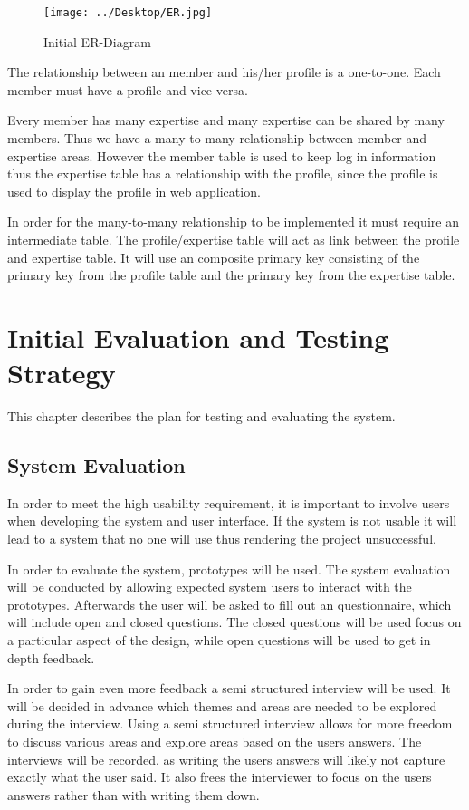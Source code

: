 \documentclass[a4paper,oneside,11pt]{report}
\begin{document}
\begin{figure}[!ht]
\centering
\texttt{[image: ../Desktop/ER.jpg]}
\caption{Initial ER-Diagram}
\end{figure}
The relationship between an member and his/her profile is a one-to-one. Each member must have a profile and vice-versa.

Every member has many expertise and many expertise can be shared by many members. Thus we have a many-to-many relationship between member and expertise areas. However the member table is used to keep log in information thus the expertise table has a relationship with the profile, since the profile is used to display the profile in web application.

In order for the many-to-many relationship to be implemented it must require an intermediate table. The profile/expertise table will act as link between the profile and expertise table. It will use an composite primary key consisting of the primary key from the profile table and the primary key from the expertise table.

\chapter{Initial Evaluation and Testing Strategy}
This chapter describes the plan for testing and evaluating the system.
\section{System Evaluation}
In order to meet the high usability requirement, it is important to involve users when developing the system and user interface. If the system is not usable it will lead to a system that no one will use thus rendering the project unsuccessful.

In order to evaluate the system, prototypes will be used. The system evaluation will be conducted by allowing expected system users to interact with the prototypes. Afterwards the user will be asked to fill out an questionnaire, which will include open and closed questions. The closed questions will be used focus on a particular aspect of the design, while open questions will be used to get in depth feedback. 

In order to gain even more feedback a semi structured interview will be used. It will be decided in advance which themes and areas are needed to be explored during the interview. Using a semi structured interview allows for more freedom to discuss various areas and explore areas based on the users answers. The interviews will be recorded, as writing the users answers will likely not capture exactly what the user said. It also frees the interviewer to focus on the users answers rather than with writing them down.
\end{document}
